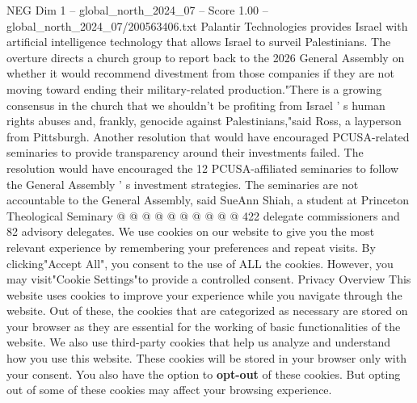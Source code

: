 \begin{textsample}{NEG Dim 1 – global\_north\_2024\_07 – Score 1.00 – global\_north\_2024\_07/200563406.txt}
Palantir Technologies provides Israel with artificial intelligence technology that allows Israel to surveil Palestinians.
The overture directs a church group to report back to the 2026 General Assembly on whether it would recommend divestment from those companies if they are not moving toward ending their military-related production."There is a growing consensus in the church that we shouldn't be profiting from Israel ' s human rights abuses and, frankly, genocide against Palestinians,"said Ross, a layperson from Pittsburgh.
Another resolution that would have encouraged PCUSA-related seminaries to provide transparency around their investments failed.
The resolution would have encouraged the 12 PCUSA-affiliated seminaries to follow the General Assembly ' s investment strategies.
The seminaries are not accountable to the General Assembly, said SueAnn Shiah, a student at Princeton Theological Seminary @ @ @ @ @ @ @ @ @ @ 422 delegate commissioners and 82 advisory delegates.
We use cookies on our website to give you the most relevant experience by remembering your preferences and repeat visits.
By clicking"Accept All", you consent to the use of ALL the cookies.
However, you may visit"Cookie Settings"to provide a controlled consent.
Privacy Overview This website uses cookies to improve your experience while you navigate through the website.
Out of these, the cookies that are categorized as necessary are stored on your browser as they are essential for the working of basic functionalities of the website.
We also use third-party cookies that help us analyze and understand how you use this website.
These cookies will be stored in your browser only with your consent.
You also have the option to \textbf{opt-out} of these cookies.
But opting out of some of these cookies may affect your browsing experience.

\end{textsample}
